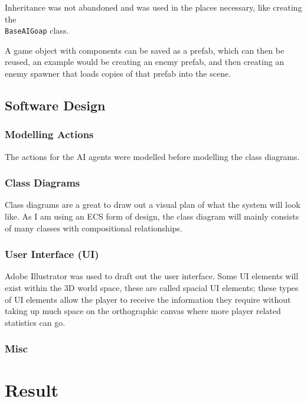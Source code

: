 \documentclass[12pt]{report}
\begin{document}
Inheritance was not abandoned and was used in the places necessary, like creating the \\ \lstinline{BaseAIGoap} class. %

A game object with components can be saved as a prefab, which can then be reused, an example would be creating an enemy prefab, and then creating an enemy spawner that loads copies of that prefab into the scene.

\section{Software Design}

\subsection{Modelling Actions}
The actions for the AI agents were modelled before modelling the class diagrams. 

\subsection{Class Diagrams}
Class diagrams are a great to draw out a visual plan of what the system will look like. As I am using an ECS form of design, the class diagram will mainly consists of many classes with compositional relationships.

\subsection{User Interface (UI)}
Adobe Illustrator was used to draft out the user interface. Some UI elements will exist within the 3D world space, these are called spacial UI elements; these types of UI elements allow the player to receive the information they require without taking up much space on the orthographic canvas where more player related statistics can go.\cite{UIChoices}

\subsection{Misc}

\chapter{Result}
\end{document}
